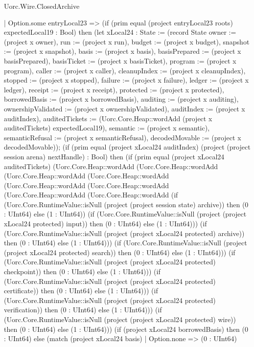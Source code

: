 \begin{lexlean}{Uorc.Wire.ClosedArchive}
\begin{semanticmodule}
{    | Option.some entryLocal23 => (if (prim equal (project entryLocal23 roots) expectedLocal19 : Bool) then (let xLocal24 : State := (record State {owner := (project x owner), run := (project x run), budget := (project x budget), snapshot := (project x snapshot), basis := (project x basis), basisPrepared := (project x basisPrepared), basisTicket := (project x basisTicket), program := (project x program), caller := (project x caller), cleanupIndex := (project x cleanupIndex), stopped := (project x stopped), failure := (project x failure), ledger := (project x ledger), receipt := (project x receipt), protected := (project x protected), borrowedBasis := (project x borrowedBasis), auditing := (project x auditing), ownershipValidated := (project x ownershipValidated), auditIndex := (project x auditIndex), auditedTickets := (Uorc.Core.Heap::wordAdd (project x auditedTickets) expectedLocal19), semantic := (project x semantic), semanticRefusal := (project x semanticRefusal), decodedMovable := (project x decodedMovable)}); (if (prim equal (project xLocal24 auditIndex) (project (project session arena) nextHandle) : Bool) then (if (prim equal (project xLocal24 auditedTickets) (Uorc.Core.Heap::wordAdd (Uorc.Core.Heap::wordAdd (Uorc.Core.Heap::wordAdd (Uorc.Core.Heap::wordAdd (Uorc.Core.Heap::wordAdd (Uorc.Core.Heap::wordAdd (Uorc.Core.Heap::wordAdd (Uorc.Core.Heap::wordAdd (if (Uorc.Core.RuntimeValue::isNull (project (project session state) archive)) then (0 : UInt64) else (1 : UInt64)) (if (Uorc.Core.RuntimeValue::isNull (project (project xLocal24 protected) input)) then (0 : UInt64) else (1 : UInt64))) (if (Uorc.Core.RuntimeValue::isNull (project (project xLocal24 protected) archive)) then (0 : UInt64) else (1 : UInt64))) (if (Uorc.Core.RuntimeValue::isNull (project (project xLocal24 protected) search)) then (0 : UInt64) else (1 : UInt64))) (if (Uorc.Core.RuntimeValue::isNull (project (project xLocal24 protected) checkpoint)) then (0 : UInt64) else (1 : UInt64))) (if (Uorc.Core.RuntimeValue::isNull (project (project xLocal24 protected) certificate)) then (0 : UInt64) else (1 : UInt64))) (if (Uorc.Core.RuntimeValue::isNull (project (project xLocal24 protected) verification)) then (0 : UInt64) else (1 : UInt64))) (if (Uorc.Core.RuntimeValue::isNull (project (project xLocal24 protected) wire)) then (0 : UInt64) else (1 : UInt64))) (if (project xLocal24 borrowedBasis) then (0 : UInt64) else (match (project xLocal24 basis)
      | Option.none => (0 : UInt64)
}
\end{semanticmodule}
\end{lexlean}
